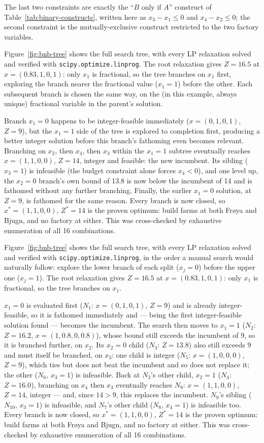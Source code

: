 The last two constraints are exactly the ``$B$ only if $A$'' construct of
Table~\ref{tab:binary-constructs}, written here as $x_3-x_1\leq0$ and
$x_4-x_2\leq0$; the second constraint is the mutually-exclusive construct
restricted to the two factory variables.

Figure~\ref{fig:bnb-tree} shows the full search tree, with every LP
relaxation solved and verified with \texttt{scipy.optimize.linprog}. The
root relaxation gives $Z=16.5$ at $x=(0.83,1,0,1)$: only $x_1$ is
fractional, so the tree branches on $x_1$ first, exploring the branch
nearer the fractional value ($x_1=1$) before the other. Each subsequent
branch is chosen the same way, on the (in this example, always unique)
fractional variable in the parent's solution.

Branch $x_1=0$ happens to be integer-feasible immediately
($x=(0,1,0,1)$, $Z=9$), but the $x_1=1$ side of the tree is explored to
completion first, producing a better integer solution before this
branch's fathoming even becomes relevant. Branching on $x_2$, then $x_4$,
then $x_3$ within the $x_1=1$ subtree eventually reaches $x=(1,1,0,0)$,
$Z=14$, integer and feasible: the new incumbent. Its sibling ($x_3=1$) is
infeasible (the budget constraint alone forces $x_4<0$), and one level up,
the $x_2=0$ branch's own bound of 13.8 is now below the incumbent of 14
and is fathomed without any further branching. Finally, the earlier
$x_1=0$ solution, at $Z=9$, is fathomed for the same reason. Every branch
is now closed, so $x^\ast=(1,1,0,0)$, $Z^\ast=14$ is the proven optimum:
build farms at both Fr{\o}ya and Bjugn, and no factory at either. This was
cross-checked by exhaustive enumeration of all 16 combinations.

Figure~\ref{fig:bnb-tree} shows the full search tree, with every LP
relaxation solved and verified with \texttt{scipy.optimize.linprog}, in
the order a manual search would naturally follow: explore the lower branch
of each split ($x_j=0$) before the upper one ($x_j=1$). The root
relaxation gives $Z=16.5$ at $x=(0.83,1,0,1)$: only $x_1$ is fractional,
so the tree branches on $x_1$.

$x_1=0$ is evaluated first ($N_1$: $x=(0,1,0,1)$, $Z=9$) and is already
integer-feasible, so it is fathomed immediately and --- being the first
integer-feasible solution found --- becomes the incumbent. The search
then moves to $x_1=1$ ($N_2$: $Z=16.2$, $x=(1,0.8,0,0.8)$), whose bound
still exceeds the incumbent of 9, so it is branched further, on $x_2$.
Its $x_2=0$ child ($N_3$: $Z=13.8$) also still exceeds 9 and must itself
be branched, on $x_3$: one child is integer ($N_5$: $x=(1,0,0,0)$,
$Z=9$), which ties but does not beat the incumbent and so does not
replace it; the other ($N_6$, $x_3=1$) is infeasible. Back at $N_2$'s
other child, $x_2=1$ ($N_4$: $Z=16.0$), branching on $x_4$ then $x_3$
eventually reaches $N_9$: $x=(1,1,0,0)$, $Z=14$, integer --- and, since
$14>9$, this replaces the incumbent. $N_9$'s sibling ($N_{10}$, $x_3=1$)
is infeasible, and $N_7$'s other child ($N_8$, $x_4=1$) is infeasible
too. Every branch is now closed, so $x^\ast=(1,1,0,0)$, $Z^\ast=14$ is
the proven optimum: build farms at both Fr{\o}ya and Bjugn, and no
factory at either. This was cross-checked by exhaustive enumeration of
all 16 combinations.

